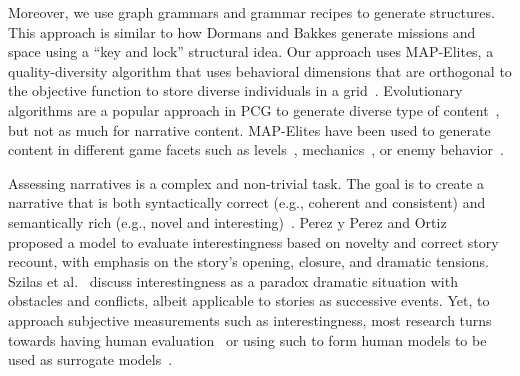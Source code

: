 Moreover, we use graph grammars and grammar recipes to generate structures. This approach is similar to how Dormans and Bakkes  generate missions and space using a ``key and lock'' structural idea. Our approach uses MAP-Elites, a quality-diversity algorithm that uses behavioral dimensions that are orthogonal to the objective function to store diverse individuals in a grid~. Evolutionary algorithms are a popular approach in PCG to generate diverse type of content~, but not as much for narrative content. MAP-Elites have been used to generate content in different game facets such as levels~, mechanics~, or enemy behavior~.



Assessing narratives is a complex and non-trivial task. The goal is to create a narrative that is both syntactically correct (e.g., coherent and consistent) and semantically rich (e.g., novel and interesting)~. Perez y Perez and Ortiz~ proposed a model to evaluate interestingness based on novelty and correct story recount, with emphasis on the story's opening, closure, and dramatic tensions. Szilas et al.~ discuss interestingness as a paradox dramatic situation with obstacles and conflicts, albeit applicable to stories as successive events. Yet, to approach subjective measurements such as interestingness, most research turns towards having human evaluation~ or using such to form human models to be used as surrogate models~.



%
